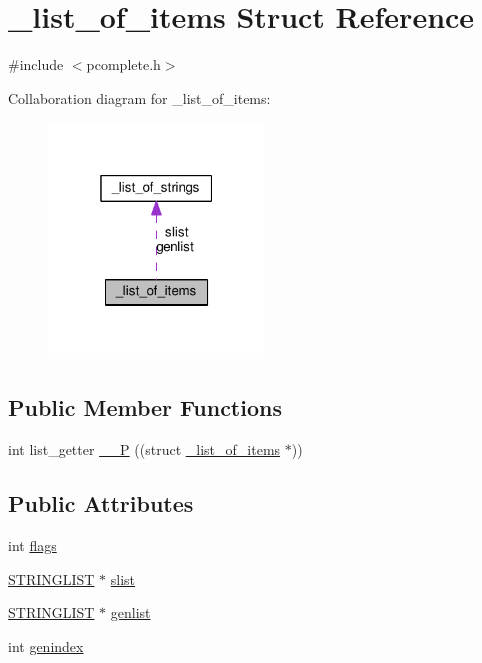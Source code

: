 \hypertarget{struct__list__of__items}{}\section{\+\_\+list\+\_\+of\+\_\+items Struct Reference}
\label{struct__list__of__items}


{\ttfamily \#include $<$pcomplete.\+h$>$}



Collaboration diagram for \+\_\+list\+\_\+of\+\_\+items\+:
\nopagebreak
\begin{figure}[H]
\begin{center}
\leavevmode
\includegraphics[width=163pt]{struct__list__of__items__coll__graph}
\end{center}
\end{figure}
\subsection*{Public Member Functions}
\begin{DoxyCompactItemize}
\item 
int list\+\_\+getter \hyperlink{struct__list__of__items_a400c71ca049f953c8471b300c64dc1e2}{\+\_\+\+\_\+P} ((struct \hyperlink{struct__list__of__items}{\+\_\+list\+\_\+of\+\_\+items} $\ast$))
\end{DoxyCompactItemize}
\subsection*{Public Attributes}
\begin{DoxyCompactItemize}
\item 
int \hyperlink{struct__list__of__items_a30ef236927b55d94fe6c6fc555c118b4}{flags}
\item 
\hyperlink{externs_8h_a278124bbcc96be39e8b7485a7ddfa038}{S\+T\+R\+I\+N\+G\+L\+I\+ST} $\ast$ \hyperlink{struct__list__of__items_a97a05d10fc76fd2802524c017f6f83b6}{slist}
\item 
\hyperlink{externs_8h_a278124bbcc96be39e8b7485a7ddfa038}{S\+T\+R\+I\+N\+G\+L\+I\+ST} $\ast$ \hyperlink{struct__list__of__items_a8e0d2617812516da3f9dfcc76f5642ea}{genlist}
\item 
int \hyperlink{struct__list__of__items_abb5d60bc72cf10d157f467fa261c61ce}{genindex}
\end{DoxyCompactItemize}


